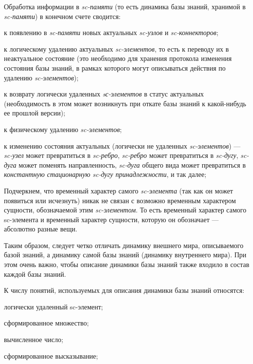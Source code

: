 Обработка информации в \textit{sc-памяти} (то есть динамика базы знаний, хранимой в \textit{sc-памяти}) в конечном счете сводится:
\begin{textitemize}
	\item к появлению в \textit{sc-памяти} новых актуальных \textit{sc-узлов} и \textit{sc-коннекторов};
	\item к логическому удалению актуальных \textit{sc-элементов}, то есть к переводу их в неактуальное состояние (это необходимо для хранения протокола изменения состояния базы знаний, в рамках которого могут описываться действия по удалению \textit{sc-элементов});
	\item к возврату логически удаленных \textit{sс-элементов} в статус актуальных (необходимость в этом может возникнуть при откате базы знаний к какой-нибудь ее прошлой версии);
	\item к физическому удалению \textit{sc-элементов};
	\item к изменению состояния актуальных (логически не удаленных \textit{sc-элементов}) --- \textit{sc-узел} может превратиться в \textit{sc-ребро}, \textit{sc-ребро} может превратиться в \textit{sc-дугу}, \textit{sc-дуга} может поменять направленность, \textit{sc-дуга} общего вида может превратиться в \textit{константную стационарную sc-дугу принадлежности}, и так далее;
\end{textitemize}

Подчеркнем, что временный характер самого \textit{sc-элемента} (так как он может появиться или исчезнуть) никак не связан с возможно временным характером сущности, обозначаемой этим \textit{sc-элементом}. То есть временный характер самого sc-элемента и временный характер сущности, которую он обозначает --- абсолютно разные вещи.

Таким образом, следует четко отличать динамику внешнего мира, описываемого базой знаний, а динамику самой базы знаний (динамику внутреннего мира). При этом очень важно, чтобы описание динамики базы знаний также входило в состав каждой базы знаний.

К числу понятий, используемых для описания динамики базы знаний относятся:
\begin{textitemize}
	\item логически удаленный sc-элемент;
	\item сформированное множество;
	\item вычисленное число;
	\item сформированное высказывание;
\end{textitemize}

